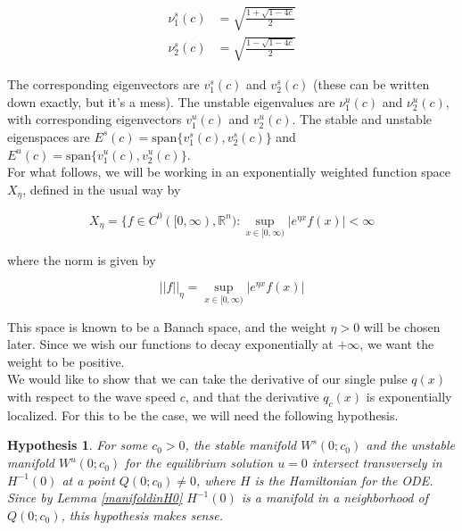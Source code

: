 \documentclass[12pt]{article}
\def\R{{\mathbb R}}
\newtheorem{hypothesis}{Hypothesis}
\begin{document}
\begin{align*}
\nu_1^s(c) &= \sqrt{ \frac{1 + \sqrt{1 - 4c} }{2}}\\
\nu_2^s(c) &= \sqrt{ \frac{1 - \sqrt{1 - 4c} }{2}}
\end{align*}

The corresponding eigenvectors are $v_1^s(c)$ and $v_2^s(c)$ (these can be written down exactly, but it's a mess). The unstable eigenvalues are $\nu_1^u(c)$ and $\nu_2^u(c)$, with corresponding eigenvectors $v_1^u(c)$ and $v_2^u(c)$. The stable and unstable eigenspaces are $E^s(c) = \text{span}\{ v_1^s(c), v_2^s(c) \}$ and $E^u(c) = \text{span}\{ v_1^u(c), v_2^u(c) \}$.\\

For what follows, we will be working in an exponentially weighted function space $X_\eta$, defined in the usual way by 

\[
X_\eta = \{ f \in C^0([0, \infty), \R^n) : \sup_{x \in [0, \infty)} |e^{\eta x} f(x)| < \infty 
\]

where the norm is given by

\[
||f||_\eta = \sup_{x \in [0, \infty)} |e^{\eta x} f(x)|
\]

This space is known to be a Banach space, and the weight $\eta > 0$ will be chosen later. Since we wish our functions to decay exponentially at $+\infty$, we want the weight to be positive.\\

We would like to show that we can take the derivative of our single pulse $q(x)$ with respect to the wave speed $c$, and that the derivative $q_c(x)$ is exponentially localized. For this to be the case, we will need the following hypothesis.

\begin{hypothesis}\label{transverseint}
For some $c_0 > 0$, the stable manifold $W^s(0; c_0)$ and the unstable manifold $W^u(0; c_0)$ for the equilibrium solution $u = 0$ intersect transversely in $H^{-1}(0)$ at a point $Q(0; c_0) \neq 0$, where $H$ is the Hamiltonian for the ODE. Since by Lemma \eqref{manifoldinH0} $H^{-1}(0)$ is a manifold in a neighborhood of $Q(0; c_0)$, this hypothesis makes sense.
\end{hypothesis}
\end{document}
